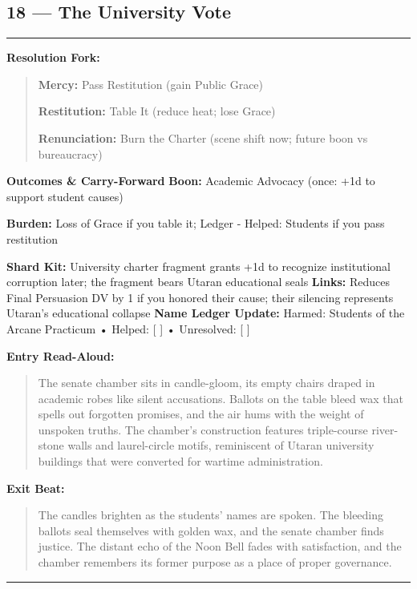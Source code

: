 \documentclass[18pt, letterpaper, twoside]{article}
\newenvironment{floorbox}[1]{%
    \begin{center}
    \begin{minipage}{0.95\textwidth}
    \subsection*{#1}
    \vspace{-0.5em}
    \rule{\textwidth}{0.5pt}
    \vspace{0.5em}
}{%
    \vspace{0.5em}
    \rule{\textwidth}{0.5pt}
    \end{minipage}
    \end{center}
}
\newenvironment{resolutionbox}{%
    \vspace{0.5em}
    \noindent\textbf{Resolution Fork:}
    \begin{quote}
}{%
    \end{quote}
    \vspace{0.5em}
}
\newenvironment{boxedtext}[1]{%
    \vspace{0.5em}
    \noindent\textbf{#1}
    \begin{quote}
}{%
    \end{quote}
    \vspace{0.5em}
}
\newcommand{\boon}[1]{\noindent\textbf{Boon:} #1\par}
\newcommand{\burden}[1]{\noindent\textbf{Burden:} #1\par}
\newcommand{\entrytext}[1]{\begin{boxedtext}{Entry Read-Aloud:} #1 \end{boxedtext}}
\newcommand{\exittext}[1]{\begin{boxedtext}{Exit Beat:} #1 \end{boxedtext}}
\begin{document}
\begin{floorbox}{18 --- The University Vote}
\begin{resolutionbox}
\textbf{Mercy:} Pass Restitution (gain Public Grace)

\textbf{Restitution:} Table It (reduce heat; lose Grace)

\textbf{Renunciation:} Burn the Charter (scene shift now; future boon vs bureaucracy)
\end{resolutionbox}

\textbf{Outcomes \& Carry-Forward}
\boon{Academic Advocacy (once: +1d to support student causes)}
\burden{Loss of Grace if you table it; Ledger - Helped: Students if you pass restitution}
\textbf{Shard Kit:} University charter fragment grants +1d to recognize institutional corruption later; the fragment bears Utaran educational seals
\textbf{Links:} Reduces Final Persuasion DV by 1 if you honored their cause; their silencing represents Utaran's educational collapse
\textbf{Name Ledger Update:} Harmed: Students of the Arcane Practicum • Helped: [ ] • Unresolved: [ ]

\entrytext{The senate chamber sits in candle-gloom, its empty chairs draped in academic robes like silent accusations. Ballots on the table bleed wax that spells out forgotten promises, and the air hums with the weight of unspoken truths. The chamber's construction features triple-course river-stone walls and laurel-circle motifs, reminiscent of Utaran university buildings that were converted for wartime administration.}

\exittext{The candles brighten as the students' names are spoken. The bleeding ballots seal themselves with golden wax, and the senate chamber finds justice. The distant echo of the Noon Bell fades with satisfaction, and the chamber remembers its former purpose as a place of proper governance.}
\end{floorbox}
\end{document}
